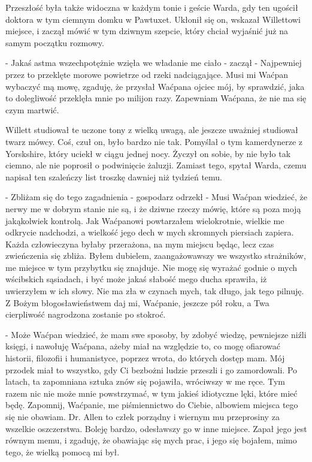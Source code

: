 Przeszłość była także widoczna w każdym tonie i geście Warda, gdy ten ugościł doktora w tym ciemnym domku w Pawtuxet. Ukłonił się on, wskazał Willettowi miejsce, i zaczął mówić w tym dziwnym szepcie, który chciał wyjaśnić już na samym początku rozmowy.

- Jakaś astma wszechpotężnie wzięła we władanie me ciało - zaczął - Najpewniej przez to przeklęte morowe powietrze od rzeki nadciągające. Musi mi Waćpan wybaczyć mą mowę, zgaduję, że przysłał Waćpana ojciec mój, by sprawdzić, jaka to dolegliwość przeklęła mnie po milijon razy. Zapewniam Waćpana, że nie ma się czym martwić. 

Willett studiował te uczone tony z wielką uwagą, ale jeszcze uważniej studiował twarz mówcy. Coś, czuł on, było bardzo nie tak. Pomyślał o tym kamerdynerze z Yorskshire, który uciekł w ciągu jednej nocy. Życzył on sobie, by nie było tak ciemno, ale nie poprosił o podwinięcie żaluzji. Zamiast tego, spytał Warda, czemu napisał ten szaleńczy list troszkę dawniej niż tydzień temu.

- Zbliżam się do tego zagadnienia - gospodarz odrzekł - Musi Waćpan wiedzieć, że nerwy me w dobrym stanie nie są, i że dziwne rzeczy mówię, które są poza moją jakąkolwiek kontrolą. Jak Waćpanowi powtarzałem wielokrotnie, wielkie me odkrycie nadchodzi, a wielkość jego dech w mych skromnych piersiach zapiera. Każda człowieczyna byłaby przerażona, na mym miejscu będąc, lecz czas zwieńczenia się zbliża. Byłem dubielem, zaangażowawszy we wszystko strażników, me miejsce w tym przybytku się znajduje. Nie mogę się wyrażać godnie o mych wścibskich sąsiadach, i być może jakaś słabość mego ducha sprawiła, iż uwierzyłem w ich słowy. Nie ma zła w czynach mych, tak długo, jak tego pilnuję. Z Bożym błogosławieństwem daj mi, Waćpanie, jeszcze pół roku, a Twa cierpliwość nagrodzona zostanie po stokroć. 

- Może Waćpan wiedzieć, że mam swe sposoby, by zdobyć wiedzę, pewniejsze niźli księgi, i nawołuję Waćpana, ażeby miał na względzie to, co mogę ofiarować historii, filozofii i humanistyce, poprzez wrota, do których dostęp mam. Mój przodek miał to wszystko, gdy Ci bezbożni ludzie przeszli i go zamordowali. Po latach, ta zapomniana sztuka znów się pojawiła, wróciwszy w me ręce. Tym razem nic nie może mnie powstrzymać, w tym jakieś idiotyczne lęki, które mieć będę. Zapomnij, Waćpanie, me piśmiennictwo do Ciebie, albowiem miejsca tego się nie obawiam. Dr. Allen to człek porządny i wiernym mu przeprosiny za wszelkie oszczerstwa. Boleję bardzo, odesławszy go w inne miejsce. Zapał jego jest równym memu, i zgaduję, że obawiając się mych prac, i jego się bojałem, mimo tego, że wielką pomocą mi był. 

